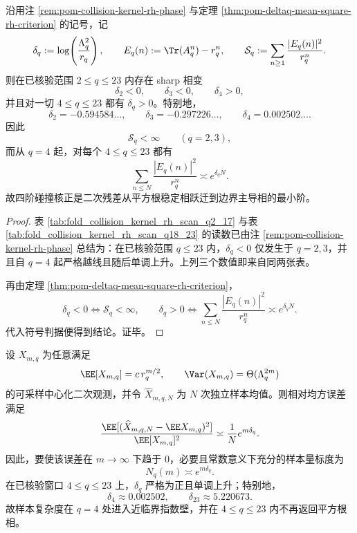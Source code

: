 \begin{theorem}[\texorpdfstring{$q=4$}{q=4} 是二次观测失去平方根稳定性的最小越线阶]\label{thm:conclusion-kernel-rh-q4-minimal-threshold}
沿用注 \ref{rem:pom-collision-kernel-rh-phase} 与定理 \ref{thm:pom-deltaq-mean-square-rh-criterion} 的记号，记
\[
\delta_q:=\log\!\left(\frac{\Lambda_q^2}{r_q}\right),
\qquad
E_q(n):=\Tr(A_q^n)-r_q^n,
\qquad
\mathcal S_q:=\sum_{n\ge 1}\frac{|E_q(n)|^2}{r_q^n}.
\]
则在已核验范围 \(2\le q\le 23\) 内存在 sharp 相变
\[
\delta_2<0,\qquad \delta_3<0,\qquad \delta_4>0,
\]
并且对一切 \(4\le q\le 23\) 都有 \(\delta_q>0\)。特别地，
\[
\delta_2=-0.594584\ldots,\qquad
\delta_3=-0.297226\ldots,\qquad
\delta_4=0.002502\ldots.
\]
因此
\[
\mathcal S_q<\infty \qquad (q=2,3),
\]
而从 \(q=4\) 起，对每个 \(4\le q\le 23\) 都有
\[
\sum_{n\le N}\frac{|E_q(n)|^2}{r_q^n}\asymp e^{\delta_q N}.
\]
故四阶碰撞核正是二次残差从平方根稳定相跃迁到边界主导相的最小阶。
\end{theorem}

\begin{proof}
表 \ref{tab:fold_collision_kernel_rh_scan_q2_17} 与表 \ref{tab:fold_collision_kernel_rh_scan_q18_23} 的读数已由注 \ref{rem:pom-collision-kernel-rh-phase} 总结为：在已核验范围 \(q\le 23\) 内，\(\delta_q<0\) 仅发生于 \(q=2,3\)，并且自 \(q=4\) 起严格越线且随后单调上升。上列三个数值即来自同两张表。

再由定理 \ref{thm:pom-deltaq-mean-square-rh-criterion}，
\[
\delta_q<0 \iff \mathcal S_q<\infty,
\qquad
\delta_q>0 \iff \sum_{n\le N}\frac{|E_q(n)|^2}{r_q^n}\asymp e^{\delta_q N}.
\]
代入符号判据便得到结论。证毕。
\end{proof}

\begin{corollary}[中心化二次观测的指数样本壁与已核验窗中的无再入性]\label{cor:conclusion-kernel-rh-sample-wall-no-reentry}
设 \(X_{m,q}\) 为任意满足
\[
\EE[X_{m,q}]=c\,r_q^{m/2},
\qquad
\Var(X_{m,q})=\Theta(\Lambda_q^{2m})
\]
的可采样中心化二次观测，并令 \(\widehat X_{m,q,N}\) 为 \(N\) 次独立样本均值。则相对均方误差满足
\[
\frac{\EE[(\widehat X_{m,q,N}-\EE X_{m,q})^2]}{\EE[X_{m,q}]^2}
\asymp
\frac{1}{N}e^{m\delta_q}.
\]
因此，要使该误差在 \(m\to\infty\) 下趋于 \(0\)，必要且常数意义下充分的样本量标度为
\[
N_q(m)\asymp e^{m\delta_q}.
\]
在已核验窗口 \(4\le q\le 23\) 上，\(\delta_q\) 严格为正且单调上升；特别地，
\[
\delta_4\approx 0.002502,\qquad
\delta_{23}\approx 5.220673.
\]
故样本复杂度在 \(q=4\) 处进入近临界指数壁，并在 \(4\le q\le 23\) 内不再返回平方根相。
\end{corollary}

